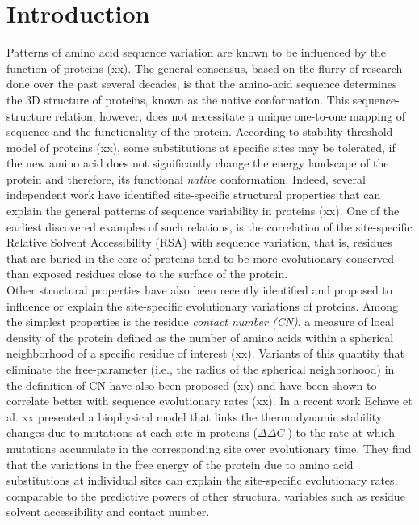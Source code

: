 \documentclass[12pt]{article}
\newcommand{\ddg}{$\Delta\Delta G~$}
\begin{document}
\section{Introduction}
\label{sec:intro}

    Patterns of amino acid sequence variation are known to be influenced by the function of proteins (xx). The general consensus, based on the flurry of research done over the past several decades, is that the amino-acid sequence determines the 3D structure of proteins, known as the native conformation. This sequence-structure relation, however, does not necessitate a unique one-to-one mapping of sequence and the functionality of the protein. According to stability threshold model of proteins {\color{red}(xx)}, some substitutions at specific sites may be tolerated, if the new amino acid does not significantly change the energy landscape of the protein and therefore, its functional {\it native} conformation. Indeed, several independent work have identified site-specific structural properties that can explain the general patterns of sequence variability in proteins {\color{red}(xx)}. One of the earliest discovered examples of such relations, is the correlation of the site-specific Relative Solvent Accessibility (RSA) with sequence variation, that is, residues that are buried in the core of proteins tend to be more evolutionary conserved than exposed residues close to the surface of the protein.
    \\

    Other structural properties have also been recently identified and proposed to influence or explain the site-specific evolutionary variations of proteins. Among the simplest properties is the residue {\it contact number (CN)}, a measure of local density of the protein defined as the number of amino acids within a spherical neighborhood of a specific residue of interest {\color{red}(xx)}. Variants of this quantity that eliminate the free-parameter (i.e., the radius of the spherical neighborhood) in the definition of CN have also been proposed {\color{red}(xx)} and have been shown to correlate better with sequence evolutionary rates {\color{red}(xx)}.   In a recent work {\color{red}Echave et al. xx} presented a biophysical model that links the thermodynamic stability changes due to mutations at each site in proteins (\ddg) to the rate at which mutations accumulate in the corresponding site over evolutionary time. They find that the variations in the free energy of the protein due to amino acid substitutions at individual sites can explain the site-specific evolutionary rates, comparable to the predictive powers of other structural variables such as residue solvent accessibility and contact number.
    \\
\end{document}

